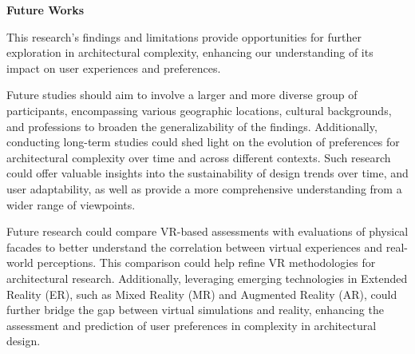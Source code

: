 



\textbf{Future Works}

This research's findings and limitations provide opportunities for further exploration in architectural complexity, enhancing our understanding of its impact on user experiences and preferences.


Future studies should aim to involve a larger and more diverse group of participants, encompassing various geographic locations, cultural backgrounds, and professions to broaden the generalizability of the findings.
Additionally, conducting long-term studies could shed light on the evolution of preferences for architectural complexity over time and across different contexts.
Such research could offer valuable insights into the sustainability of design trends over time, and user adaptability, as well as provide a more comprehensive understanding from a wider range of viewpoints.


Future research could compare VR-based assessments with evaluations of physical facades to better understand the correlation between virtual experiences and real-world perceptions.
This comparison could help refine VR methodologies for architectural research.
Additionally, leveraging emerging technologies in Extended Reality (ER), such as Mixed Reality (MR) and Augmented Reality (AR), could further bridge the gap between virtual simulations and reality, enhancing the assessment and prediction of user preferences in complexity in architectural design.



